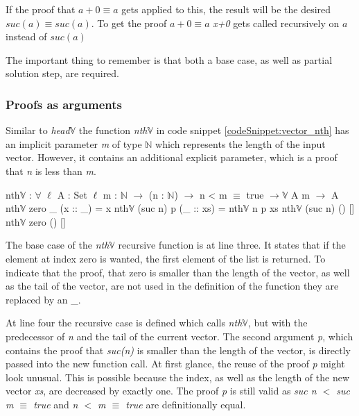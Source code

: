 If the proof that $a + 0 \equiv a$ gets applied to this, the result will be the desired $suc(a) \equiv suc(a)$. 
To get the proof $a + 0 \equiv a$ \emph{x+0} gets called recursively on $a$ instead of $suc(a)$

The important thing to remember is that both a base case, as well as partial solution step, are required.

\subsubsection{Proofs as arguments}

Similar to \emph{head$\mathbb{V}$} the function \emph{nth$\mathbb{V}$} in code snippet \ref{codeSnippet:vector_nth} has an implicit parameter \emph{m} of type $\mathbb{N}$ which represents the length of the input vector. 
However, it contains an additional explicit parameter, which is a proof that \emph{n} is less than \emph{m}.

\begin{codesnippet}[mathescape=true, caption={\emph{Nth} function for vectors}, label={codeSnippet:vector_nth}]
nth$\mathbb{V}$ : $\forall$ {$\ell$} {A : Set $\ell$} {m : $\mathbb{N}$} $\rightarrow$
       (n : $\mathbb{N}$) $\rightarrow$ n < m $\equiv$ true $\rightarrow \mathbb{V}$ A m $\rightarrow$ A
nth$\mathbb{V}$ zero _ (x :: _) = x
nth$\mathbb{V}$ (suc n) p (_ :: xs) = nth$\mathbb{V}$ n p xs
nth$\mathbb{V}$ (suc n) () []
nth$\mathbb{V}$ zero () []
\end{codesnippet}

The base case of the \emph{nth$\mathbb{V}$} recursive function is at line three. It states that if the element at index zero is wanted, the first element of the list is returned.
To indicate that the proof, that zero is smaller than the length of the vector, as well as the tail of the vector, are not used in the definition of the function they are replaced by an \_.

At line four the recursive case is defined which calls \emph{nth$\mathbb{V}$}, but with the predecessor of \emph{n} and the tail of the current vector.
The second argument \emph{p}, which contains the proof that \emph{suc(n)} is smaller than the length of the vector, is directly passed into the new function call. 
At first glance, the reuse of the proof \emph{p} might look unusual. 
This is possible because the index, as well as the length of the new vector \emph{xs}, are decreased by exactly one.
The proof \emph{p} is still valid as \emph{suc n $<$ suc m $\equiv$ true} and \emph{n $<$ m $\equiv$ true} are definitionally equal.

